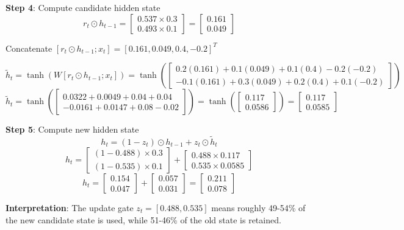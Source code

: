 \documentclass[11pt,a4paper]{article}
\begin{document}
\begin{tcolorbox}[colback=green!5!white,colframe=green!75!black,title=\textbf{Worked Example 23: GRU Gate Computations}]
\textbf{Step 4}: Compute candidate hidden state
\[
r_t \odot h_{t-1} = \begin{bmatrix} 0.537 \times 0.3 \\ 0.493 \times 0.1 \end{bmatrix} = \begin{bmatrix} 0.161 \\ 0.049 \end{bmatrix}
\]

Concatenate $[r_t \odot h_{t-1}; x_t] = [0.161, 0.049, 0.4, -0.2]^T$

\[
\tilde{h}_t = \tanh(W [r_t \odot h_{t-1}; x_t]) = \tanh\left(\begin{bmatrix} 0.2(0.161) + 0.1(0.049) + 0.1(0.4) - 0.2(-0.2) \\ -0.1(0.161) + 0.3(0.049) + 0.2(0.4) + 0.1(-0.2) \end{bmatrix}\right)
\]
\[
\tilde{h}_t = \tanh\left(\begin{bmatrix} 0.0322 + 0.0049 + 0.04 + 0.04 \\ -0.0161 + 0.0147 + 0.08 - 0.02 \end{bmatrix}\right) = \tanh\left(\begin{bmatrix} 0.117 \\ 0.0586 \end{bmatrix}\right) = \begin{bmatrix} 0.117 \\ 0.0585 \end{bmatrix}
\]

\textbf{Step 5}: Compute new hidden state
\[
h_t = (1 - z_t) \odot h_{t-1} + z_t \odot \tilde{h}_t
\]
\[
h_t = \begin{bmatrix} (1-0.488) \times 0.3 \\ (1-0.535) \times 0.1 \end{bmatrix} + \begin{bmatrix} 0.488 \times 0.117 \\ 0.535 \times 0.0585 \end{bmatrix}
\]
\[
h_t = \begin{bmatrix} 0.154 \\ 0.047 \end{bmatrix} + \begin{bmatrix} 0.057 \\ 0.031 \end{bmatrix} = \begin{bmatrix} 0.211 \\ 0.078 \end{bmatrix}
\]

\textbf{Interpretation}: The update gate $z_t = [0.488, 0.535]$ means roughly 49-54\% of the new candidate state is used, while 51-46\% of the old state is retained.
\end{tcolorbox}
\end{document}
